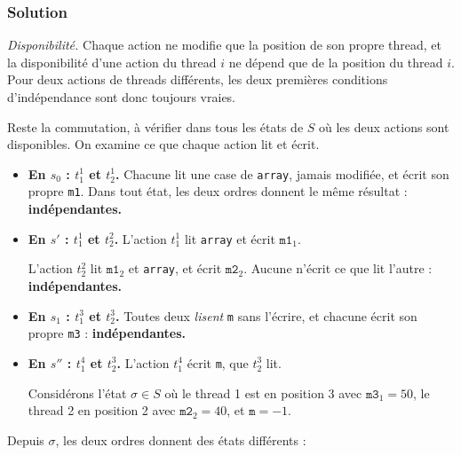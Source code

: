 \documentclass[11pt,a4paper]{article}
\begin{document}
\hypertarget{solution-15}{%
\subsubsection{Solution}\label{solution-15}}

\emph{Disponibilité.} Chaque action ne modifie que la position de son propre thread, et la disponibilité d'une action du thread \(i\) ne dépend que de la position du thread \(i\). Pour deux actions de threads différents, les deux premières conditions d'indépendance sont donc toujours vraies.

Reste la commutation, à vérifier dans tous les états de \(S\) où les deux actions sont disponibles. On examine ce que chaque action lit et écrit.

\begin{itemize}
\item
  \textbf{En \(s_0\) : \(t_1^1\) et \(t_2^1\).} Chacune lit une case de \texttt{array}, jamais modifiée, et écrit son propre \texttt{m1}. Dans tout état, les deux ordres donnent le même résultat : \textbf{indépendantes.}
\item
  \textbf{En \(s'\) : \(t_1^1\) et \(t_2^2\).} L'action \(t_1^1\) lit \texttt{array} et écrit \(\texttt{m1}_1\).

  L'action \(t_2^2\) lit \(\texttt{m1}_2\) et \texttt{array}, et écrit \(\texttt{m2}_2\). Aucune n'écrit ce que lit l'autre : \textbf{indépendantes.}
\item
  \textbf{En \(s_1\) : \(t_1^3\) et \(t_2^3\).} Toutes deux \emph{lisent} \texttt{m} sans l'écrire, et chacune écrit son propre \texttt{m3} : \textbf{indépendantes.}
\item
  \textbf{En \(s''\) : \(t_1^4\) et \(t_2^3\).} L'action \(t_1^4\) écrit \texttt{m}, que \(t_2^3\) lit.

  Considérons l'état \(\sigma\in S\) où le thread 1 est en position 3 avec \(\texttt{m3}_1=50\), le thread 2 en position 2 avec \(\texttt{m2}_2=40\), et \(\texttt m=-1\).
\end{itemize}

Depuis \(\sigma\), les deux ordres donnent des états différents :
\end{document}
